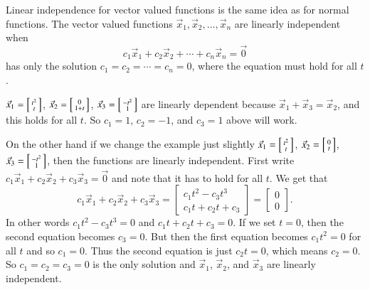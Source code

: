 \documentclass[12pt]{book}
\begin{document}
Linear independence for vector valued functions is the same idea as
for normal functions.
The vector valued functions
$\vec{x}_1,\vec{x}_2,\ldots,\vec{x}_n$ are
linearly independent
when
\begin{equation*}
c_1 \vec{x}_1 + c_2 \vec{x}_2 + \cdots + c_n \vec{x}_n  = \vec{0}
\end{equation*}
has only the solution $c_1 = c_2 = \cdots = c_n = 0$, where the equation
must hold for all $t$.

\begin{example}
$\vec{x}_1 = \Bigl[ \begin{smallmatrix} t^2 \\ t \end{smallmatrix} \Bigr]$,
$\vec{x}_2 = \Bigl[ \begin{smallmatrix} 0 \\ 1+t \end{smallmatrix} \Bigr]$,
$\vec{x}_3 = \Bigl[ \begin{smallmatrix} -t^2 \\ 1 \end{smallmatrix} \Bigr]$
are linearly dependent because
$\vec{x}_1 + \vec{x}_3 = \vec{x}_2$, and this holds for all $t$.  So $c_1 =
1$, $c_2 = -1$, and $c_3 = 1$ above will work.

On the other hand if we change the example just slightly
$\vec{x}_1 = \Bigl[ \begin{smallmatrix} t^2 \\ t \end{smallmatrix} \Bigr]$,
$\vec{x}_2 = \Bigl[ \begin{smallmatrix} 0 \\ t \end{smallmatrix} \Bigr]$,
$\vec{x}_3 = \Bigl[ \begin{smallmatrix} -t^2 \\ 1 \end{smallmatrix}
\Bigr]$,
then the functions are linearly independent.
First write
$c_1 \vec{x}_1 + c_2 \vec{x}_2 + c_3 \vec{x}_3  = \vec{0}$ and note that it
has to hold for all $t$.  We get that
\begin{equation*}
c_1 \vec{x}_1 + c_2 \vec{x}_2 + c_3 \vec{x}_3
=
\begin{bmatrix}
c_1 t^2 - c_3 t^3
\\
c_1 t + c_2 t + c_3 
\end{bmatrix}
=
\begin{bmatrix}
0
\\
0
\end{bmatrix} .
\end{equation*}
In other words
$c_1 t^2 - c_3 t^3 = 0$ and
$c_1 t + c_2 t + c_3 = 0$.
If we set $t = 0$, then the second equation becomes $c_3 = 0$.  But then
the first equation becomes
$c_1 t^2 = 0$ for all $t$ and so $c_1 = 0$.  Thus the second equation
is just $c_2 t = 0$, which means $c_2 = 0$.  So $c_1 = c_2 = c_3 = 0$
is the only solution and $\vec{x}_1$,
$\vec{x}_2$, and $\vec{x}_3$ are linearly independent.
\end{example}
\end{document}
